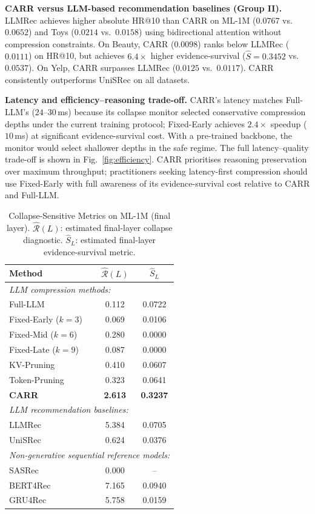 \documentclass[lettersize,journal]{IEEEtran}
\begin{document}
\textbf{CARR versus LLM-based recommendation baselines (Group II).} LLMRec achieves higher absolute HR@10 than CARR on ML-1M ($0.0767$ vs.\ $0.0652$) and Toys ($0.0214$ vs.\ $0.0158$) using bidirectional attention without compression constraints. On Beauty, CARR ($0.0098$) ranks below LLMRec ($0.0111$) on HR@10, but achieves $6.4\times$ higher evidence-survival ($\widehat{S}=0.3452$ vs.\ $0.0537$). On Yelp, CARR surpasses LLMRec ($0.0125$ vs.\ $0.0117$). CARR consistently outperforms UniSRec on all datasets.

\textbf{Latency and efficiency--reasoning trade-off.} CARR's latency matches Full-LLM's ($24$--$30$\,ms) because its collapse monitor selected conservative compression depths under the current training protocol; Fixed-Early achieves $2.4\times$ speedup ($10$\,ms) at significant evidence-survival cost. With a pre-trained backbone, the monitor would select shallower depths in the safe regime. The full latency--quality trade-off is shown in Fig.~\ref{fig:efficiency}. CARR prioritises reasoning preservation over maximum throughput; practitioners seeking latency-first compression should use Fixed-Early with full awareness of its evidence-survival cost relative to CARR and Full-LLM.

\begin{table}[!t]
\caption{Collapse-Sensitive Metrics on ML-1M (final layer). $\widehat{\mathcal{R}}(L)$: estimated final-layer collapse diagnostic. $\widehat{S}_L$: estimated final-layer evidence-survival metric.\label{tab:collapse_metrics}}
\centering
\begin{tabular}{l|cc}
\toprule
\textbf{Method} & $\widehat{\mathcal{R}}(L)$ & $\widehat{S}_L$ \\
\midrule
\multicolumn{3}{l}{\textit{LLM compression methods:}} \\
Full-LLM & 0.112 & 0.0722 \\
Fixed-Early ($k=3$) & 0.069 & 0.0106 \\
Fixed-Mid ($k=6$) & 0.280 & 0.0000 \\
Fixed-Late ($k=9$) & 0.087 & 0.0000 \\
KV-Pruning & 0.410 & 0.0607 \\
Token-Pruning & 0.323 & 0.0641 \\
\textbf{CARR} & \textbf{2.613} & \textbf{0.3237} \\
\midrule
\multicolumn{3}{l}{\textit{LLM recommendation baselines:}} \\
LLMRec & 5.384 & 0.0705 \\
UniSRec & 0.624 & 0.0376 \\
\midrule
\multicolumn{3}{l}{\textit{Non-generative sequential reference models:}} \\
SASRec & 0.000 & -- \\
BERT4Rec & 7.165 & 0.0940 \\
GRU4Rec & 5.758 & 0.0159 \\
\bottomrule
\end{tabular}
\end{table}
\end{document}

